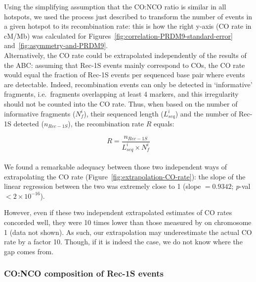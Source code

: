 Using the simplifying assumption that the CO:NCO ratio is similar in all hotspots, we used the process just described to transform the number of events in a given hotspot to its recombination rate: this is how the right y-axis (CO rate in cM/Mb) was calculated for Figures~\ref{fig:correlation-PRDM9-standard-error} and~\ref{fig:asymmetry-and-PRDM9}.\\

Alternatively, the CO rate could be extrapolated independently of the results of the ABC\@: assuming that Rec-1S events mainly correspond to COs, the CO rate would equal the fraction of Rec-1S events per sequenced base pair where events are detectable.
Indeed, recombination events can only be detected in ‘informative’ fragments, i.e.\ fragments overlapping at least 4 markers, and this irregularity should not be counted into the CO rate.
Thus, when based on the number of informative fragments ($N^{i}_{f}$), their sequenced length ($L^{i}_{seq}$) and the number of Rec-1S detected ($n_{Rec-1S}$), the recombination rate $R$ equals:

\begin{equation*}
    R = \frac{n_{Rec-1S}}{L^{i}_{seq} \times N^{i}_{f}}
\end{equation*}\\



We found a remarkable adequacy between those two independent ways of extrapolating the CO rate (Figure~\ref{fig:extrapolation-CO-rate}): the slope of the linear regression between the two was extremely close to 1 (slope $ =0.9342$; \textit{p}-val $< 2 \times 10^{-16}$).


However, even if these two independent extrapolated estimates of CO rates concorded well, they were 10 times lower than those measured by \citet{paigen2008recombinational} on chromosome 1 (data not shown). 
As such, our extrapolation may underestimate the actual CO rate by a factor 10. Though, if it is indeed the case, we do not know where the gap comes from.






\subsubsection{CO:NCO composition of Rec-1S events}


